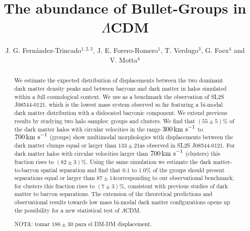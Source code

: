 \documentclass{emulateapj}
\newcommand{\hkpc}{{\ifmmode{h^{-1}{\rm kpc}}\else{$h^{-1}$kpc }\fi}}
\newcommand{\kms}{{\ifmmode{{\mathrm{\,km\ s}^{-1}}}\else{\,km~s$^{-1}$}\fi}}
\newcommand{\bullg}{SL2S J08544-0121}
\begin{document}
 

\title{The abundance of Bullet-Groups in $\Lambda$CDM}
\author{J. G. Fern\'andez-Trincado$^{1,2,3}$, J. E. Forero-Romero$^1$,
  T. Verdugo$^3$, G. Foex$^4$ and V. Motta$^4$} 

\begin{abstract}

We estimate the expected distribution of displacements between the two
dominant dark matter density peaks and between baryons and dark matter
in halos simulated within a full cosmological context. We use as a benchmark the
observation of \bullg, which is the lowest mass system observed so far
featuring a bi-modal dark matter distribution with a dislocated 
baryonic component. We extend previous results by
studying two halo samples: groups and clusters. We find that $(55\pm 5)\%$
of the dark matter halos with circular velocities in the range
$300\kms$ to $700\kms$ (groups) show multimodal morphologies with
displacements between the dark matter clumps equal or larger than
$133\pm21$\hkpc as observed in \bullg. For dark matter halos with
circular velocities larger than $700\kms$ (clusters) this fraction
rises to $(82\pm 3)\%$. Using the same simulation we estimate the
dark matter-to-baryon spatial separation and find that $0.1$ to
$1.0\%$ of the groups should present separations equal or
larger than $87\pm 14$\hkpc corresponding to our observational
benchmark; for clusters this fraction rises to $(7\pm 3)\%$, consistent
with previous studies of dark matter to baryon separations. The
extension of the theoretical predictions and observational results
towards low mass bi-modal dark matter configurations opens up the
possibility for a new statistical test of  $\Lambda$CDM.


NOTA: tomar $186\pm 30$ para el DM-DM displacement.

\end{abstract}
\end{document}
